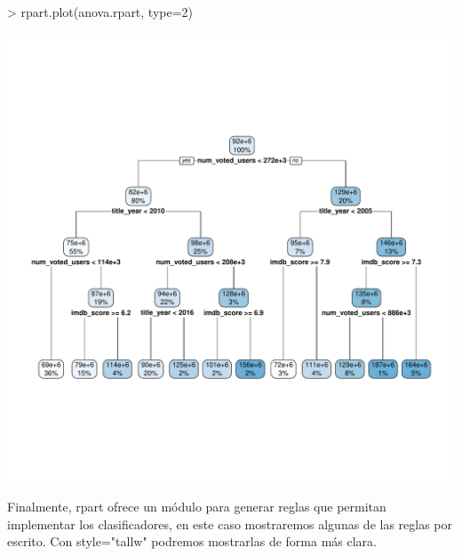 \documentclass[a4paper]{article}
\begin{document}
\begin{Schunk}
\begin{Sinput}
> rpart.plot(anova.rpart, type=2)
\end{Sinput}
\end{Schunk}
\includegraphics{practica-3-rpart3}

Finalmente, rpart ofrece un módulo para generar reglas que permitan implementar los clasificadores, en este caso mostraremos algunas de las reglas por escrito. Con style="tallw" podremos mostrarlas de forma más clara.
\end{document}
